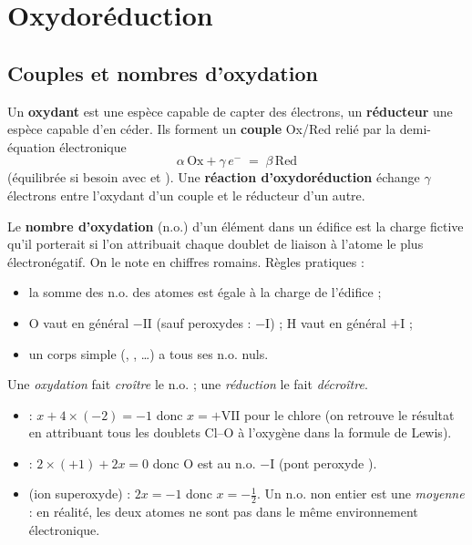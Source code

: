 \section{Oxydoréduction}

\subsection{Couples et nombres d'oxydation}

\begin{definition}
Un \textbf{oxydant} est une espèce capable de capter des électrons, un \textbf{réducteur} une espèce capable d'en céder. Ils forment un \textbf{couple} Ox/Red relié par la demi-équation électronique
\[ \alpha\,\mathrm{Ox} + \gamma\,e^- \;=\; \beta\,\mathrm{Red} \]
(équilibrée si besoin avec  et ). Une \textbf{réaction d'oxydoréduction} échange $\gamma$ électrons entre l'oxydant d'un couple et le réducteur d'un autre.
\end{definition}

\begin{definition}
Le \textbf{nombre d'oxydation} (n.o.) d'un élément dans un édifice est la charge fictive qu'il porterait si l'on attribuait chaque doublet de liaison à l'atome le plus électronégatif. On le note en chiffres romains. Règles pratiques :
\begin{itemize}
  \item la somme des n.o. des atomes est égale à la charge de l'édifice ;
  \item O vaut en général $-\mathrm{II}$ (sauf peroxydes : $-\mathrm{I}$) ; H vaut en général $+\mathrm{I}$ ;
  \item un corps simple (, , \dots) a tous ses n.o. nuls.
\end{itemize}
Une \emph{oxydation} fait \emph{croître} le n.o. ; une \emph{réduction} le fait \emph{décroître}.
\end{definition}

\begin{exemple}[calculs de n.o.]
\begin{itemize}
  \item {} : $x + 4\times(-2) = -1$ donc $x = +\mathrm{VII}$ pour le chlore (on retrouve le résultat en attribuant tous les doublets Cl--O à l'oxygène dans la formule de Lewis).
  \item {} : $2\times(+1) + 2x = 0$ donc O est au n.o. $-\mathrm{I}$ (pont peroxyde ).
  \item {} (ion superoxyde) : $2x = -1$ donc $x = -\tfrac12$. Un n.o. non entier est une \emph{moyenne} : en réalité, les deux atomes ne sont pas dans le même environnement électronique.
\end{itemize}
\end{exemple}


